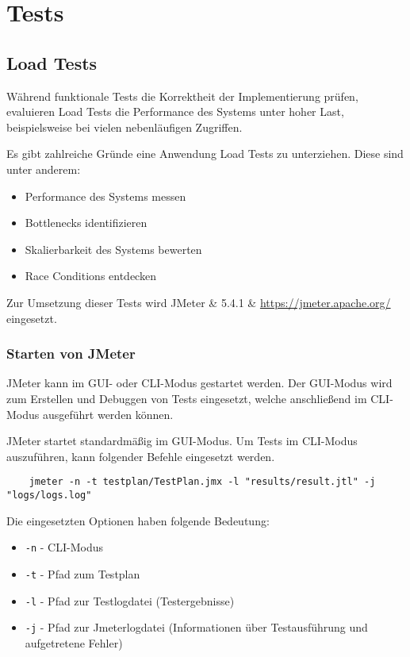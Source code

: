 \chapter{Tests}

\section{Load Tests}

Während funktionale Tests die Korrektheit der Implementierung prüfen,
evaluieren Load Tests die Performance des Systems unter hoher Last,
beispielsweise bei vielen nebenläufigen Zugriffen.

Es gibt zahlreiche Gründe eine Anwendung Load Tests zu unterziehen.
Diese sind unter anderem:

\begin{itemize}
    \item Performance des Systems messen
    \item Bottlenecks identifizieren
    \item Skalierbarkeit des Systems bewerten
    \item Race Conditions entdecken
\end{itemize}

Zur Umsetzung dieser Tests wird JMeter \& 5.4.1 \& \url{https://jmeter.apache.org/} eingesetzt.

\subsection{Starten von JMeter}

JMeter kann im GUI- oder CLI-Modus gestartet werden.
Der GUI-Modus wird zum Erstellen und Debuggen von Tests eingesetzt,
welche anschließend im CLI-Modus ausgeführt werden können.

JMeter startet standardmäßig im GUI-Modus.
Um Tests im CLI-Modus auszuführen, kann folgender Befehle eingesetzt werden.

\begin{lstlisting}
    jmeter -n -t testplan/TestPlan.jmx -l "results/result.jtl" -j "logs/logs.log"
\end{lstlisting}

Die eingesetzten Optionen haben folgende Bedeutung:

\begin{itemize}
    \item \texttt{-n} - CLI-Modus
    \item \texttt{-t} - Pfad zum Testplan
    \item \texttt{-l} - Pfad zur Testlogdatei (Testergebnisse)
    \item \texttt{-j} - Pfad zur Jmeterlogdatei (Informationen über Testausführung und aufgetretene Fehler)
\end{itemize}

